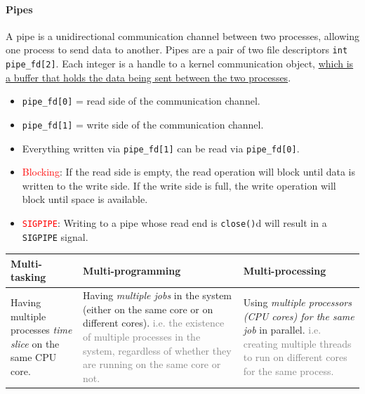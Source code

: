 \documentclass[openany,12pt]{book}
\newcommand{\code}[1]{\texttt{#1}}
\newcommand{\red}[1]{\textcolor{Red}{#1}}
\newcommand{\gray}[1]{\textcolor{gray}{#1}}
\begin{document}
\paragraph{Pipes} A pipe is a unidirectional communication channel between two processes, allowing one process to send data to another. Pipes are a pair of two file descriptors \code{int pipe\_fd[2]}. Each integer is a handle to a kernel communication object, \ul{which is a buffer that holds the data being sent between the two processes}.
\begin{itemize}
    \item \code{pipe\_fd[0]} = read side of the communication channel.
    \item \code{pipe\_fd[1]} = write side of the communication channel.
    \item Everything written via \code{pipe\_fd[1]} can be read via \code{pipe\_fd[0]}.
    \item \red{Blocking}: If the read side is empty, the read operation will block until data is written to the write side. If the write side is full, the write operation will block until space is available.
    \item \red{\code{SIGPIPE}}: Writing to a pipe whose read end is \code{close()}d will result in a \code{SIGPIPE} signal.
\end{itemize}



\begin{samepage}
    \begin{center}
        \begin{tabular}{|>{\raggedright\arraybackslash}p{4cm}|
            >{\raggedright\arraybackslash}p{6cm}|
            >{\raggedright\arraybackslash}p{5cm}|}
            \hline
            \rowcolor{blue!30}
            \textbf{Multi-tasking} & \textbf{Multi-programming} & \textbf{Multi-processing} \\
            \hline
            Having multiple processes \textit{time slice} on the same CPU core.
                                   &
            Having \textit{multiple jobs} in the system (either on the same core or on different cores). \gray{i.e. the existence of multiple processes in the system, regardless of whether they are running on the same core or not.}
                                   &
            Using \textit{multiple processors (CPU cores) for the same job} in parallel. \gray{i.e. creating multiple threads to run on different cores for the same process.}
            \\
            \hline
        \end{tabular}
    \end{center}
\end{samepage}
\end{document}
